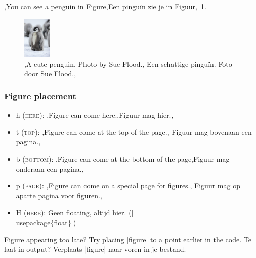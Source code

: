 \documentclass[presentatie.tex]{subfiles}
\begin{document}
\begin{frame}{}
	\vspace{-28px}
	
	\begin{penExResult}[3cm]
		\lang,You can see a penguin in Figure,Een pinguïn zie je in Figuur,~\ref{fig:pinguin}.
		\begin{figure}[h]
			\centering
			\includegraphics[height=2cm]{assets/pinguin.jpg}
			\caption{\lang,A cute penguin. Photo by Sue Flood.,%
			Een schattige pinguïn. Foto door Sue Flood.,}\label{fig:pinguin}
		\end{figure}
	\end{penExResult}
\end{frame}


\begin{frame}
	\frametitle{Figure placement}

	
	\begin{itemize}
		\item h \textsc{(here)}: \lang,Figure can come here.,Figuur mag hier.,
		\item t \textsc{(top)}: \lang,Figure can come at the top of the page.,%
			Figuur mag bovenaan een pagina.,
		\item b \textsc{(bottom)}: \lang,Figure can come at the bottom of the
			page,Figuur mag onderaan een pagina.,
		\item p \textsc{(page)}: \lang,Figure can come on a special page for figures.,%
			Figuur mag op aparte pagina voor figuren.,
		\item H \textsc{(here)}: 
		{Geen floating, altijd hier.} (\hll|\\usepackage\{float\}|)
	\end{itemize}

	\medskip
	\lang
	{Figure appearing too late? Try placing \hll|figure| to a point earlier in the code.}
	{Te laat in output? Verplaats \hll|figure| naar voren in je bestand.}

\end{frame}
\end{document}
